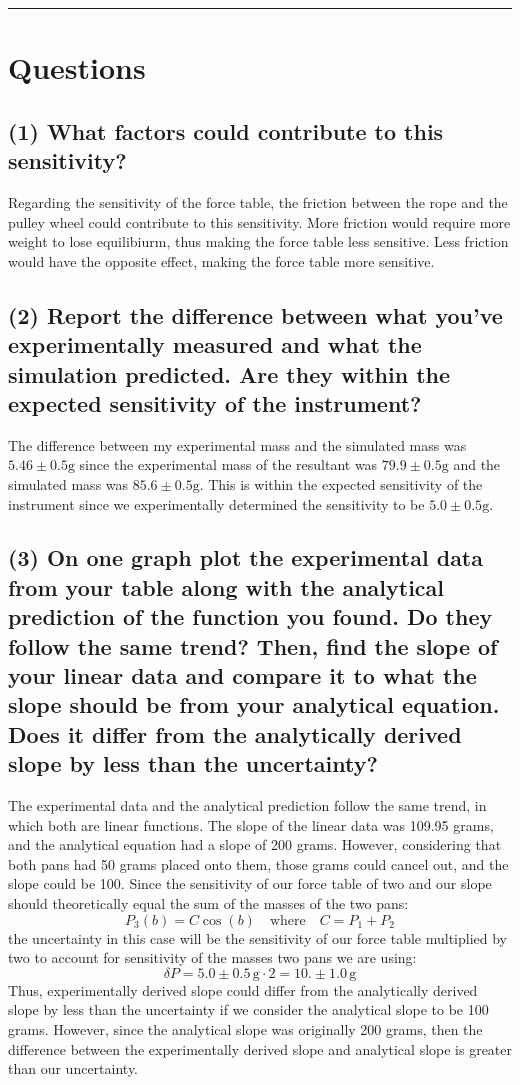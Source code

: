 \documentclass{article}
\begin{document}
\bigskip
\hrule

\section{Questions}
\subsection*{\normalsize(1) What factors could contribute to this sensitivity?}
Regarding the sensitivity of the force table, the friction between the rope 
and the pulley wheel could contribute to this sensitivity. More friction would 
require more weight to lose equilibiurm, thus making the force table less 
sensitive. Less friction would have the opposite effect, making the force table 
more sensitive.

\subsection*{\normalsize(2) Report the difference between what you've experimentally measured and 
what the simulation predicted. Are they within the expected sensitivity of the 
instrument?}
The difference between my experimental mass and the simulated mass was $5.46\pm0.5\mathrm{g}$
since the experimental mass of the resultant was $79.9\pm0.5\mathrm{g}$ and the simulated mass 
was $85.6\pm0.5\mathrm{g}$. This is within the expected sensitivity of the instrument since we 
experimentally determined the sensitivity to be $5.0\pm0.5\mathrm{g}$.

\subsection*{\normalsize(3) On one graph plot the experimental data from your table along with the 
analytical prediction of the function you found. Do they follow the same trend?
Then, find the slope of your linear data and compare it to what the slope should be from 
your analytical equation. Does it differ from the analytically derived slope by less 
than the uncertainty?}
The experimental data and the analytical prediction follow the same trend, in which both 
are linear functions. The slope of the linear data was 109.95 grams, and the analytical equation had a slope of 
200 grams. However, considering that both pans had 50 grams placed onto them, those grams 
could cancel out, and the slope could be 100. Since the sensitivity of our force table of two
and our slope should theoretically equal the sum of the masses of the two pans:
\[ P_3(b) = C\cos(b) \quad \text{where} \quad C=P_1+P_2 \]
the uncertainty in this case will be the sensitivity of our force table multiplied by two to
account for sensitivity of the masses two pans we are using:
\[ \delta P = 5.0\pm0.5\,\mathrm{g}\cdot 2 = 10.\pm1.0\,\mathrm{g} \]
Thus, experimentally derived slope could differ from the analytically derived slope by 
less than the uncertainty if we consider the analytical slope to be 100 grams. However, 
since the analytical slope was originally 200 grams, then the difference between the 
experimentally derived slope and analytical slope is greater than our uncertainty.
\end{document}
